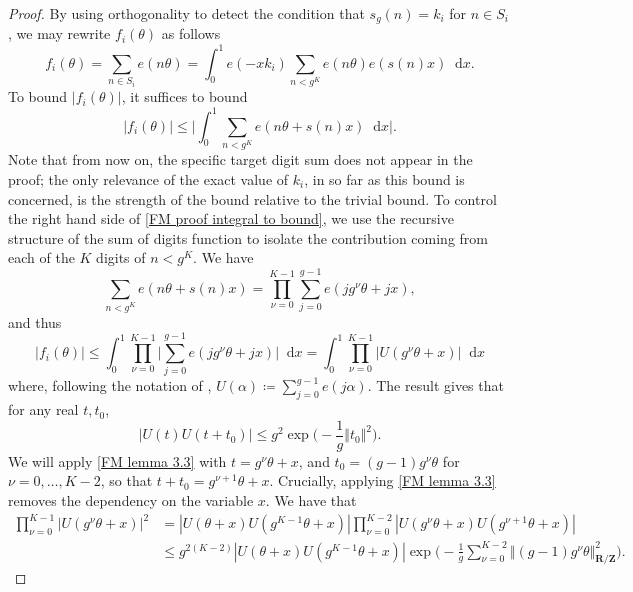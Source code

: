 \documentclass[hidelinks,11pt,reqno]{amsart}
\renewcommand{\leq}{\leqslant}
\newcommand{\Z}{\ensuremath{\mathbf{Z}}}
\newcommand{\R}{\ensuremath{\mathbf{R}}}
\newcommand*\dif{\mathop{}\!\mathrm{d}}
\newcommand{\Vertr}{\Vert_{\R/\Z}}
\newcommand{\V}[1]{\Vert #1 \Vertr}
\theoremstyle{remark}
\begin{document}
\begin{proof}
    By using orthogonality to detect the condition that $s_{g}(n)=k_{i}$ for $n\in S_{i}$, we may rewrite $f_{i}(\theta)$ as follows
    \[f_{i}(\theta)=\sum_{n\in S_{i}}e(n\theta)=\int_{0}^{1}e(-x k_{i})\sum_{n<g^{K}}e(n\theta)e(s(n)x)\dif x.\]
    To bound $|f_{i}(\theta)|$, it suffices to bound
    \begin{equation}\label{FM proof integral to bound}
        |f_{i}(\theta)|\leq \Big | \int_{0}^{1}\sum_{n<g^{K}}e(n\theta+s(n)x)\dif x\Big |.
    \end{equation}
    Note that from now on, the specific target digit sum does not appear in the proof; the only relevance of the exact value of $k_{i}$, in so far as this bound is concerned, is the strength of the bound relative to the trivial bound. To control the right hand side of \cref{FM proof integral to bound}, we use the recursive structure of the sum of digits function to isolate the contribution coming from each of the $K$ digits of $n<g^{K}$. We have
    \[\sum_{n<g^{K}}e(n\theta+s(n)x)=\prod_{\nu=0}^{K-1}\sum_{j=0}^{g-1}e(jg^{\nu}\theta+jx),\]
    and thus
    \begin{equation}\label{FM proof f bound}
        |f_{i}(\theta)|\leq \int_{0}^{1}\prod_{\nu=0}^{K-1}\Big |\sum_{j=0}^{g-1}e(jg^{\nu}\theta+jx)\Big |\dif x=\int_{0}^{1}\prod_{\nu=0}^{K-1}|U(g^{\nu}\theta+x)|\dif x
    \end{equation}
    where, following the notation of \cite{fouvry2005entiers}, $U(\alpha)\coloneq \sum_{j=0}^{g-1}e(j\alpha)$. The result \citep[Lemma 3.3]{fouvry2005entiers} gives that for any real $t,t_{0}$,
    \begin{equation}\label{FM lemma 3.3}
        |U(t)U(t+t_{0})|\leq g^{2}\exp\big (-\frac{1}{g}\Vert t_{0}\Vert^{2} \big ).
    \end{equation}
    We will apply \cref{FM lemma 3.3} with $t=g^{\nu}\theta+x$, and $t_{0}=(g-1)g^{\nu}\theta$ for $\nu=0,\ldots, K-2$, so that $t+t_{0}=g^{\nu+1}\theta+x$. Crucially, applying \cref{FM lemma 3.3} removes the dependency on the variable $x$. We have that
    \begin{align}
     \prod_{\nu=0}^{K-1}|U(g^{\nu}\theta+x)|^{2}&=|U(\theta+x)U(g^{K-1}\theta+x)|\prod_{\nu=0}^{K-2}|U(g^{\nu}\theta+x)U(g^{\nu+1}\theta+x)|\nonumber\\
     &\leq g^{2(K-2)}|U(\theta+x)U(g^{K-1}\theta+x)|\exp \Big (-\frac{1}{g}\sum_{\nu=0}^{K-2}\V{ (g-1) g^{\nu}\theta}^{2}\Big ).\label{squared ver}
    \end{align}

\end{proof}
\end{document}

